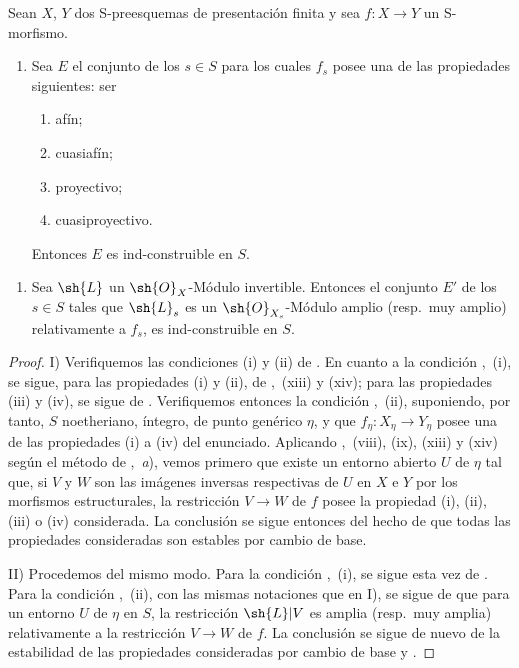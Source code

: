 \begin{proposition}[9.6.2]
\label{IV.9.6.2}
Sean $X$, $Y$ dos S-preesquemas de presentación finita y sea $f:X\to Y$ un S-morfismo.
\begin{enumerate}[label=\upshape{I)}]
  \item Sea $E$ el conjunto de los $s\in S$ para los cuales $f_s$ posee una de las propiedades siguientes: ser
  \begin{enumerate}[label=\textup{(\roman*)}]
    \item afín;
    \item cuasiafín;
    \item proyectivo;
    \item cuasiproyectivo.
  \end{enumerate}
  Entonces $E$ es ind-construible en $S$.
\end{enumerate}


\begin{enumerate}[label=\upshape{II)}]
  \item Sea $\sh{L}$ un $\sh{O}_X$-Módulo invertible.
  Entonces el conjunto $E'$ de los $s\in S$ tales que $\sh{L}_s$ es un $\sh{O}_{X_s}$-Módulo amplio \textup{(resp.}\ muy amplio\textup{)} relativamente a $f_s$, es ind-construible en $S$.
\end{enumerate}
\end{proposition}

\begin{proof}
I) Verifiquemos las condiciones (i) y (ii) de .
En cuanto a la condición ,~(i), se sigue, para las propiedades (i) y (ii), de ,~(xiii) y (xiv); para las propiedades (iii) y (iv), se sigue de .
Verifiquemos entonces la condición ,~(ii), suponiendo, por tanto, $S$ noetheriano, íntegro, de punto genérico $\eta$, y que $f_\eta:X_\eta\to Y_\eta$ posee una de las propiedades (i) a (iv) del enunciado.
Aplicando ,~(viii), (ix), (xiii) y (xiv) según el método de ,~\emph{a}), vemos primero que existe un entorno abierto $U$ de $\eta$ tal que, si $V$ y $W$ son las imágenes inversas respectivas de $U$ en $X$ e $Y$ por los morfismos estructurales, la restricción $V\to W$ de $f$ posee la propiedad (i), (ii), (iii) o (iv) considerada.
La conclusión se sigue entonces del hecho de que todas las propiedades consideradas son estables por cambio de base.

II) Procedemos del mismo modo.
Para la condición ,~(i), se sigue esta vez de .
Para la condición ,~(ii), con las mismas notaciones que en I), se sigue de  que para un entorno $U$ de $\eta$ en $S$, la restricción $\sh{L}|V$ es amplia (resp.\ muy amplia) relativamente a la restricción $V\to W$ de $f$.
La conclusión se sigue de nuevo de la estabilidad de las propiedades consideradas por cambio de base  y .
\end{proof}

